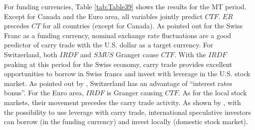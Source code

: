 \documentclass[a4paper, twoside]{templates/ociamthesis}
\begin{document}
\begin{table}[H]

\caption{\label{tab:Table38}Granger causality tests for target currencies, MT period}
\centering
{}
\end{table}

For funding currencies, Table \ref{tab:Table39} shows the results for the MT period. Except for Canada and the Euro area, all variables jointly predict \(CTF\). \(ER\) precedes \(CT\) for all countries (except for Canada). As \textcite{gubler2014} pointed out for the Swiss Franc as a funding currency, nominal exchange rate fluctuations are a good predictor of carry trade with the U.S. dollar as a target currency. For Switzerland, both \(IRDF\) and \(SMUS\) Granger cause \(CTF\). With the \(IRDF\) peaking at this period for the Swiss economy, carry trade provides excellent opportunities to borrow in Swiss francs and invest with leverage in the U.S. stock market. As pointed out by \textcite{vallet2016}, Switzerland has an advantage of ``interest rates bonus''. For the Euro area, \(IRDF\) is Granger causing \(CTF\). As for the local stock markets, their movement precedes the carry trade activity. As shown by \textcite{nishigaki2007}, with the possibility to use leverage with carry trade, international speculative investors can borrow (in the funding currency) and invest locally (domestic stock market).
\end{document}
